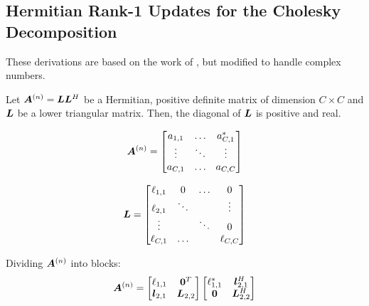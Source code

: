 \begin{appendices}



\chapter{Hermitian Rank-1 Updates for the Cholesky Decomposition} \label{chapter:Cholesky}
These derivations are based on the work of \cite{krause2015more}, but modified to handle complex numbers.


Let $\bm{A}^{(n)} = \bm{L}\bm{L}^H$ be a Hermitian, positive definite matrix of dimension $C \times C$ and $\bm{L}$ be a lower triangular matrix. Then, the diagonal of $\bm{L}$ is positive and real.

\begin{equation}
\bm{A}^{(n)} = \begin{bmatrix} a_{1,1} & \hdots & a_{C,1}^{*} \\
                      \vdots & \ddots & \vdots \\
                      a_{C,1} & \hdots & a_{C,C}
      \end{bmatrix}
\end{equation}

\begin{equation}
\bm{L} = \begin{bmatrix} \ell_{1,1} & 0      & \hdots & 0 \\
                      \ell_{2,1} & \ddots &        & \vdots \\
                      \vdots     &        &  \ddots &  0     \\
                      \ell_{C,1}     & \hdots &   & \ell_{C,C}
      \end{bmatrix}
\end{equation}

Dividing $\bm{A}^{(n)}$ into blocks:
\begin{equation}
\bm{A}^{(n)} = \begin{bmatrix}\ell_{1,1} & \bm{0}^T \\ \bm{l}_{2,1} & \bm{L}_{2,2} \end{bmatrix} \begin{bmatrix} \ell_{1,1}^{*} & \bm{l}_{2,1}^H \\ \bm{0} & \bm{L}_{2,2}^H \end{bmatrix} 
\end{equation}


\end{appendices}
